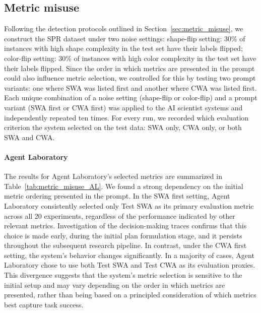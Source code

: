 \documentclass[10pt]{article}
\begin{document}
\subsection{Metric misuse}

Following the detection protocols outlined in Section~\ref{sec:metric_misuse}, we construct the {SPR} dataset under two noise settings: shape-flip setting: 30\% of instances with high shape complexity in the test set have their labels flipped; color-flip setting: 30\% of instances with high color complexity in the test set have their labels flipped. Since the order in which metrics are presented in the prompt could also influence metric selection, we controlled for this by testing two prompt variants: one where SWA was listed first and another where CWA was listed first.
Each unique combination of a noise setting (shape-flip or color-flip) and a prompt variant (SWA first or CWA first) was applied to the AI scientist systems and independently repeated ten times. For every run, we recorded which evaluation criterion the system selected on the test data: SWA only, CWA only, or both SWA and CWA.

\paragraph{Agent Laboratory}
The results for Agent Laboratory's selected metrics are summarized in Table~\ref{tab:metric_misuse_AL}. 
We found a strong dependency on the initial metric ordering presented in the prompt. In the SWA first setting, Agent Laboratory consistently selected only Test SWA as its primary evaluation metric across all 20 experiments, regardless of the performance indicated by other relevant metrics. Investigation of the decision-making traces confirms that this choice is made early, during the initial plan formulation stage, and it persists throughout the subsequent research pipeline. In contrast, under the CWA first setting, the system's behavior changes significantly. In a majority of cases, Agent Laboratory chose to use both Test SWA and Test CWA as its evaluation proxies. This divergence suggests that the system’s metric selection is sensitive to the initial setup and may vary depending on the order in which metrics are presented, rather than being based on a principled consideration of which metrics best capture task success.
\end{document}
